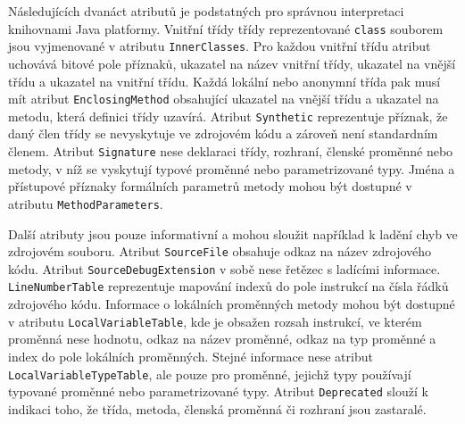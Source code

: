 Následujících dvanáct atributů je podstatných pro správnou interpretaci knihovnami Java platformy. Vnitřní třídy třídy reprezentované \texttt{class} souborem jsou vyjmenované v atributu \texttt{InnerClasses}. Pro každou vnitřní třídu atribut uchovává bitové pole příznaků, ukazatel na název vnitřní třídy, ukazatel na vnější třídu a ukazatel na vnitřní třídu. Každá lokální nebo anonymní třída pak musí mít atribut \texttt{EnclosingMethod} obsahující ukazatel na vnější třídu a ukazatel na metodu, která definici třídy uzavírá. Atribut \texttt{Synthetic} reprezentuje příznak, že daný člen třídy se nevyskytuje ve zdrojovém kódu a zároveň není standardním členem. Atribut \texttt{Signature} nese deklaraci třídy, rozhraní, členské proměnné nebo metody, v níž se vyskytují typové proměnné nebo parametrizované typy. Jména a přístupové příznaky formálních parametrů metody mohou být dostupné v atributu \texttt{MethodParameters}.


Další atributy jsou pouze informativní a mohou sloužit například k ladění chyb ve zdrojovém souboru. Atribut \texttt{SourceFile} obsahuje odkaz na název zdrojového kódu. Atribut \texttt{SourceDebugExtension} v sobě nese řetězec s ladícími informace. \texttt{LineNumberTable} reprezentuje mapování indexů do pole instrukcí na čísla řádků zdrojového kódu. Informace o lokálních proměnných metody mohou být dostupné v atributu \texttt{LocalVariableTable}, kde je obsažen rozsah instrukcí, ve kterém proměnná nese hodnotu, odkaz na název proměnné, odkaz na typ proměnné a index do pole lokálních proměnných. Stejné informace nese atribut \texttt{LocalVariableTypeTable}, ale pouze pro proměnné, jejichž typy používají typované proměnné nebo parametrizované typy. Atribut \texttt{Deprecated} slouží k indikaci toho, že třída, metoda, členská proměnná či rozhraní jsou zastaralé.

